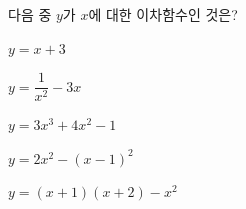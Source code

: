다음 중 $y$가 $x$에 대한 이차함수인 것은?
\begin{choicesii}{\rule[-3ex]{0pt}{8ex}$y=x+3$}{\rule[-3ex]{0pt}{8ex}$y=\dfrac{1}{x^2}-3x$}{\rule[-3ex]{0pt}{8ex}$y=3x^3+4x^2-1$}{\rule[-3ex]{0pt}{8ex}$y=2x^2-(x-1)^2$}{\rule[-3ex]{0pt}{8ex}$y=(x+1)(x+2)-x^2$}\end{choicesii}

